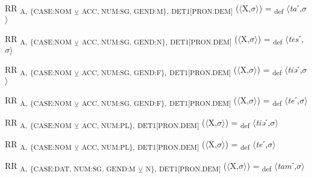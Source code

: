 {\begin{exe}
 RR \textsubscript{A,} \textsubscript{\{CASE:NOM} \textsubscript{${\veebar}$}\textsubscript{ ACC, NUM:SG, GEND:M\},} \textsubscript{DET1[PRON.DEM]} ($\langle$X,$\sigma $$\rangle$) = \textsubscript{def} $\langle$\textit{ta}ˊ,$\sigma $$\rangle$
\end{exe}

\begin{exe}
 RR \textsubscript{A,} \textsubscript{\{CASE:NOM} \textsubscript{${\veebar}$}\textsubscript{ ACC, NUM:SG, GEND:N\},} \textsubscript{DET1[PRON.DEM]} ($\langle$X,$\sigma $$\rangle$) = \textsubscript{def} $\langle$\textit{tes}ˊ,$\sigma $$\rangle$
\end{exe}

\begin{exe}
 RR \textsubscript{A,} \textsubscript{\{CASE:NOM} \textsubscript{${\veebar}$}\textsubscript{ ACC, NUM:SG, GEND:F\},} \textsubscript{DET1[PRON.DEM]} ($\langle$X,$\sigma $$\rangle$) = \textsubscript{def} $\langle$\textit{tiə}ˊ,$\sigma $$\rangle$
\end{exe}

\begin{exe}
 RR \textsubscript{A,} \textsubscript{\{CASE:NOM} \textsubscript{${\veebar}$}\textsubscript{ ACC, NUM:SG, GEND:F\},} \textsubscript{DET1[PRON.DEM]} ($\langle$X,$\sigma $$\rangle$) = \textsubscript{def} $\langle$\textit{te}ˊ,$\sigma $$\rangle$
\end{exe}

\begin{exe}
 RR \textsubscript{A,} \textsubscript{\{CASE:NOM} \textsubscript{${\veebar}$}\textsubscript{ ACC, NUM:PL\},} \textsubscript{DET1[PRON.DEM]} ($\langle$X,$\sigma $$\rangle$) = \textsubscript{def} $\langle$\textit{tiə}ˊ,$\sigma $$\rangle$
\end{exe}

\begin{exe}
 RR \textsubscript{A,} \textsubscript{\{CASE:NOM} \textsubscript{${\veebar}$}\textsubscript{ ACC, NUM:PL\},} \textsubscript{DET1[PRON.DEM]} ($\langle$X,$\sigma $$\rangle$) = \textsubscript{def} $\langle$\textit{te}ˊ,$\sigma $$\rangle$
\end{exe}

\begin{exe}
 RR \textsubscript{A,} \textsubscript{\{CASE:DAT, NUM:SG, GEND:M} \textsubscript{${\veebar}$}\textsubscript{ N\},} \textsubscript{DET1[PRON.DEM]} ($\langle$X,$\sigma $$\rangle$) = \textsubscript{def} $\langle$\textit{tam}ˊ,$\sigma $$\rangle$
\end{exe}

}
